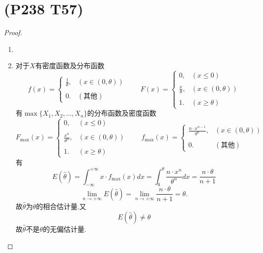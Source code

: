 \documentclass{article}
\begin{document}
\section{(P238 T57)}  %
\begin{proof}
    \begin{enumerate}
        \item []
        \item []对于$X$有密度函数及分布函数
        \[
            f(x) = 
            \begin{cases}
                \displaystyle{\frac{1}{\theta}} , & (x\in (0,\theta))\\
                \\
                0. & (\mbox{其他})
            \end{cases} 
            \qquad
            F(x) = 
            \begin{cases}
                0 , & (x \leq 0)\\
                \\
                \displaystyle{\frac{x}{\theta}} , & (x\in (0,\theta))\\
                \\
                1 . & (x\geq \theta)
            \end{cases}   
        \]
        有$\max \{X_1, X_2, \ldots, X_n\}$的分布函数及密度函数
        \[
            F_{\max} (x) = 
            \begin{cases}
                0 , & (x \leq 0)\\
                \\
                \displaystyle{\frac{x^n}{\theta^n}} , & (x\in (0,\theta))\\
                \\
                1 . & (x\geq \theta)
            \end{cases} 
            \qquad
            f_{\max} (x) = 
            \begin{cases}
                \displaystyle{\frac{n\cdot x^{n-1}}{\theta^{n}}} , & (x\in (0 , \theta))\\
                \\
                0. & (\mbox{其他})
            \end{cases}    
        \]
        有
        \[
            E(\widehat{\theta})
            = \int_{-\infty}^{+\infty} x\cdot f_{\max} (x) dx
            = \int_{0}^{\theta} \frac{n\cdot x^n}{\theta^n} dx
            = \frac{n\cdot \theta}{n + 1}
        \]
        \[
            \lim\limits_{n\to +\infty} E(\widehat{\theta})
            = \lim\limits_{n\to +\infty} \frac{n\cdot \theta}{n + 1}
            = \theta.
        \]
        故$\widehat{\theta}$为$\theta$的相合估计量.又
        \[
            E(\widehat{\theta}) \neq \theta   
        \]
        故$\widehat{\theta}$不是$\theta$的无偏估计量.
    \end{enumerate}
\end{proof}
\end{document}
